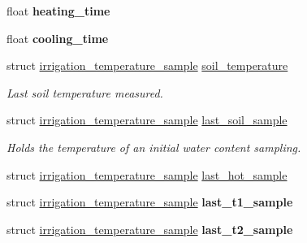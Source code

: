 \begin{DoxyCompactItemize}
\item 
\hypertarget{structirrigation__controller__status_ae84f5b8517b8fe266305aa248a6f46fc}{}float {\bfseries heating\+\_\+time}\label{structirrigation__controller__status_ae84f5b8517b8fe266305aa248a6f46fc}

\item 
\hypertarget{structirrigation__controller__status_a7b67f38b1433b1909b3afc32fe6b22d9}{}float {\bfseries cooling\+\_\+time}\label{structirrigation__controller__status_a7b67f38b1433b1909b3afc32fe6b22d9}

\item 
struct \hyperlink{structirrigation__temperature__sample}{irrigation\+\_\+temperature\+\_\+sample} \hyperlink{structirrigation__controller__status_a3ef3b031a2c91413170ad02626e8da1c}{soil\+\_\+temperature}
\begin{DoxyCompactList}\small\item\em Last soil temperature measured. \end{DoxyCompactList}\item 
struct \hyperlink{structirrigation__temperature__sample}{irrigation\+\_\+temperature\+\_\+sample} \hyperlink{structirrigation__controller__status_a2d3ef640dc3ec8ce2789fffb092d8f80}{last\+\_\+soil\+\_\+sample}
\begin{DoxyCompactList}\small\item\em Holds the temperature of an initial water content sampling. \end{DoxyCompactList}\item 
struct \hyperlink{structirrigation__temperature__sample}{irrigation\+\_\+temperature\+\_\+sample} \hyperlink{structirrigation__controller__status_ab795e232c4e2d405b11e24312a6163c3}{last\+\_\+hot\+\_\+sample}
\item 
\hypertarget{structirrigation__controller__status_a9b64c69b881c0befd37f25d81141ae24}{}struct \hyperlink{structirrigation__temperature__sample}{irrigation\+\_\+temperature\+\_\+sample} {\bfseries last\+\_\+t1\+\_\+sample}\label{structirrigation__controller__status_a9b64c69b881c0befd37f25d81141ae24}

\item 
\hypertarget{structirrigation__controller__status_af481460c8a71385556ae6a336245fb89}{}struct \hyperlink{structirrigation__temperature__sample}{irrigation\+\_\+temperature\+\_\+sample} {\bfseries last\+\_\+t2\+\_\+sample}\label{structirrigation__controller__status_af481460c8a71385556ae6a336245fb89}


\end{DoxyCompactItemize}
